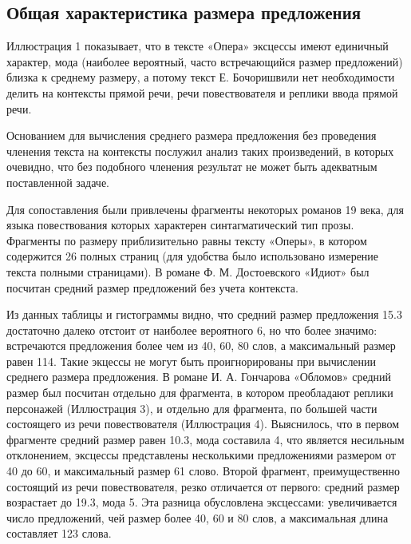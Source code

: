 \documentclass{kursa4}
\begin{document}
{      \subsection{Общая характеристика размера предложения}


        

        {Иллюстрация 1 показывает, что в тексте «Опера» эксцессы имеют единичный характер, мода (наиболее вероятный, часто встречающийся размер предложений) близка к среднему размеру, а потому текст Е. Бочоришвили нет необходимости делить на контексты прямой речи, речи повествователя и реплики ввода прямой речи. }

        {Основанием для вычисления среднего размера предложения без проведения членения текста на контексты послужил анализ таких произведений, в которых очевидно, что без подобного членения результат не может быть адекватным поставленной задаче. }

        Для сопоставления были привлечены фрагменты некоторых романов 19 века, для языка повествования которых характерен синтагматический тип прозы. Фрагменты по размеру приблизительно равны тексту «Оперы», в котором содержится 26 полных страниц (для удобства было использовано измерение текста полными страницами). В романе Ф. М. Достоевского «Идиот» был посчитан средний размер предложений без учета контекста. 

        

        Из данных таблицы и гистограммы видно, что средний размер предложения 15.3 достаточно далеко отстоит от наиболее вероятного 6, но что более значимо: встречаются предложения более чем из 40, 60, 80 слов, а максимальный размер равен 114. Такие экцессы не могут быть проигнорированы при вычислении среднего размера предложения. В романе И. А. Гончарова «Обломов» средний размер был посчитан отдельно для фрагмента, в котором преобладают реплики персонажей (Иллюстрация 3), и отдельно для фрагмента, по большей части состоящего из речи повествователя (Иллюстрация 4). Выяснилось, что в первом фрагменте средний размер равен 10.3, мода составила 4, что является несильным отклонением, эксцессы представлены несколькими предложениями размером от 40 до 60, и максимальный размер 61 слово. Второй фрагмент, преимущественно состоящий из речи повествователя, резко отличается от первого: средний размер возрастает до 19.3, мода 5. Эта разница обусловлена эксцессами: увеличивается число предложений, чей размер более 40, 60 и 80 слов, а максимальная длина составляет 123 слова. 

}
\end{document}
